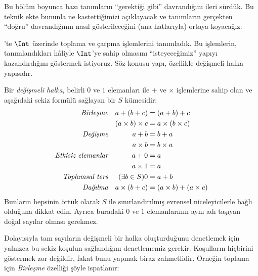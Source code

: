\documentclass[../../../include/open-logic-section]{subfiles}
\begin{document}
	

Bu bölüm boyunca bazı tanımların “gerektiği gibi” davrandığını ileri sürdük.
Bu teknik ekte bununla ne kastettiğimizi açıklayacak ve tanımların gerçekten
“doğru” davrandığının nasıl gösterileceğini (ana hatlarıyla) ortaya koyacağız.

'te $\Int$ üzerinde toplama ve çarpma işlemlerini tanımladık.
Bu işlemlerin, tanımlandıkları hâliyle $\Int$'ye sahip olmasını
“isteyeceğimiz” yapıyı kazandırdığını göstermek istiyoruz. Söz konusu yapı,
özellikle değişmeli halka yapısıdır.

\begin{defn}
	Bir \emph{değişmeli halka}, belirli $0$ ve $1$ elemanları ile $+$ ve
	$\times$ işlemlerine sahip olan ve aşağıdaki sekiz formülü sağlayan bir
	$S$ kümesidir:
	\begin{align*}
		\emph{Birleşme}&&a + (b+ c) & = (a + b) + c \\
		&& (a \times b) \times c & = a \times (b\times c)\\
		\emph{Değişme}&&a + b &= b+ a  \\
		&&  a \times b&= b\times a\\
		\emph{Etkisiz elemanlar}&&a + 0 &= a \\
		&& a \times 1 &= a\\
		\emph{Toplamsal ters}&&(\exists b\in S)0&=a + b\\
		\emph{Dağılma}&&a \times (b+ c ) &= (a \times b) + (a \times c)
	\end{align*}
	Bunların hepsinin örtük olarak $S$ ile sınırlandırılmış evrensel
	niceleyicilerle bağlı olduğuna dikkat edin. Ayrıca buradaki $0$ ve $1$
	elemanlarının aynı adı taşıyan doğal sayılar olması gerekmez.
\end{defn}

Dolayısıyla tam sayıların değişmeli bir halka oluşturduğunu denetlemek için
yalnızca bu sekiz koşulun sağlandığını denetlememiz gerekir. Koşulların
hiçbirini göstermek {zor} değildir, fakat bunu yapmak biraz zahmetlidir.
Örneğin toplama için \emph{Birleşme} özelliği şöyle ispatlanır:
\end{document}
